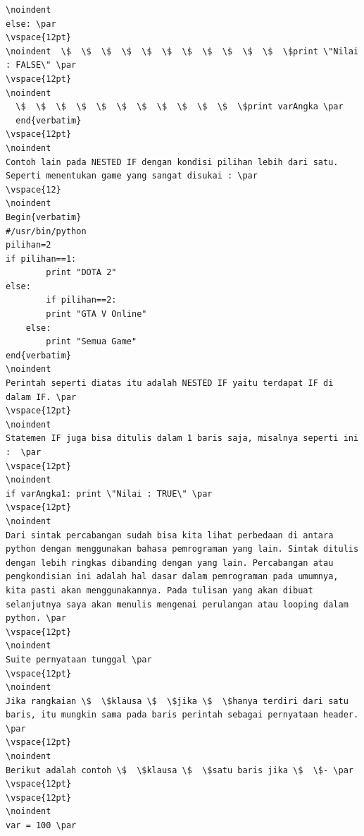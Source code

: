 \begin{verbatim}
\noindent 
else: \par
\vspace{12pt}
\noindent  \$  \$  \$  \$  \$  \$  \$  \$  \$  \$  \$  \$print \"Nilai : FALSE\" \par
\vspace{12pt}
\noindent 
  \$  \$  \$  \$  \$  \$  \$  \$  \$  \$  \$  \$print varAngka \par
  end{verbatim}
\vspace{12pt}
\noindent
Contoh lain pada NESTED IF dengan kondisi pilihan lebih dari satu. Seperti menentukan game yang sangat disukai : \par
\vspace{12}
\noindent 
Begin{verbatim}
#/usr/bin/python
pilihan=2
if pilihan==1:
        print "DOTA 2"
else:
        if pilihan==2:
		print "GTA V Online"
	else:
		print "Semua Game"
end{verbatim}
\noindent
Perintah seperti diatas itu adalah NESTED IF yaitu terdapat IF di dalam IF. \par
\vspace{12pt}
\noindent 
Statemen IF juga bisa ditulis dalam 1 baris saja, misalnya seperti ini :  \par
\vspace{12pt}
\noindent 
if varAngka1: print \"Nilai : TRUE\" \par
\vspace{12pt}
\noindent 
Dari sintak percabangan sudah bisa kita lihat perbedaan di antara python dengan menggunakan bahasa pemrograman yang lain. Sintak ditulis dengan lebih ringkas dibanding dengan yang lain. Percabangan atau pengkondisian ini adalah hal dasar dalam pemrograman pada umumnya, kita pasti akan menggunakannya. Pada tulisan yang akan dibuat selanjutnya saya akan menulis mengenai perulangan atau looping dalam python. \par
\vspace{12pt}
\noindent 
Suite pernyataan tunggal \par
\vspace{12pt}
\noindent 
Jika rangkaian \$  \$klausa \$  \$jika \$  \$hanya terdiri dari satu baris, itu mungkin sama pada baris perintah sebagai pernyataan header. \par
\vspace{12pt}
\noindent 
Berikut adalah contoh \$  \$klausa \$  \$satu baris jika \$  \$- \par
\vspace{12pt}
\vspace{12pt}
\noindent 
var = 100 \par

\end{verbatim}
